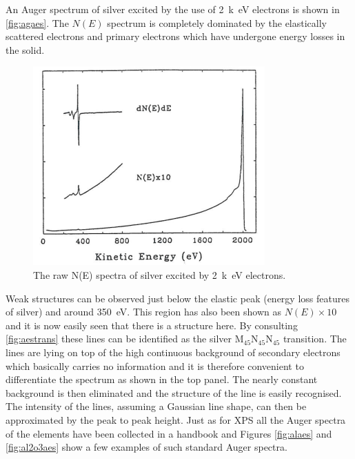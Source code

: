 An Auger spectrum of silver excited by the use of \SI{2}{k\electronvolt} electrons is shown in \autoref{fig:agaes}. The $N(E)$ spectrum is completely dominated by the elastically scattered electrons and primary electrons which have undergone energy losses in the solid.

\begin{figure}[h!]
	\begin{center}
	\includegraphics[scale=4]{figures/06_07.png}
	\caption{The raw N(E) spectra of silver excited by \SI{2}{k\electronvolt} electrons.}
	\label{fig:agaes}
	\end{center}
\end{figure}

Weak structures can be observed just below the elastic peak (energy loss features of silver) and around \SI{350}{\electronvolt}. This region has also been shown as $N(E)\times 10$ and it is now easily seen that there is a structure here. By consulting \autoref{fig:aestrans} these lines can be identified as the silver M$_{45}$N$_{45}$N$_{45}$ transition. The lines are lying on top of the high continuous background of secondary electrons which basically carries no information and it is therefore convenient to differentiate the spectrum as shown in the top panel. The nearly constant background is then eliminated and the structure of the line is easily recognised. The intensity of the lines, assuming a Gaussian line shape, can then be approximated by the peak to peak height. Just as for XPS all the Auger spectra of the elements have been collected in a handbook \cite{handbook} and Figures \ref{fig:alaes} and \ref{fig:al2o3aes} show a few examples of such standard Auger spectra.


